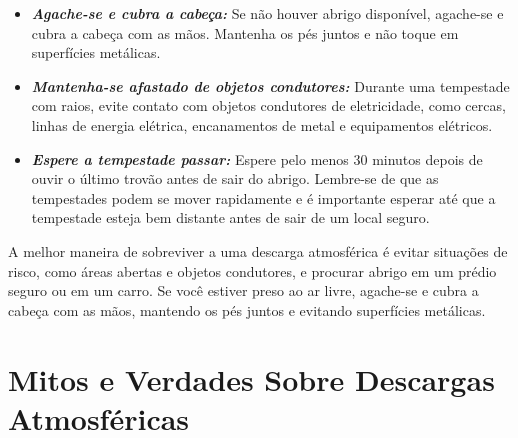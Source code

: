 \documentclass[a4paper, 12pt, onecolumn,singlespacing]{article}
\begin{document}
\begin{itemize}
\begin{itemize}
			\item \textbf{\textit{Agache-se e cubra a cabeça:}} Se não houver abrigo disponível, agache-se e cubra a cabeça com as mãos. Mantenha os pés juntos e não toque em superfícies metálicas.
			
			\item \textbf{\textit{Mantenha-se afastado de objetos condutores:}} Durante uma tempestade com raios, evite contato com objetos condutores de eletricidade, como cercas, linhas de energia elétrica, encanamentos de metal e equipamentos elétricos.
			
			\item \textbf{\textit{Espere a tempestade passar:}} Espere pelo menos 30 minutos depois de ouvir o último trovão antes de sair do abrigo. Lembre-se de que as tempestades podem se mover rapidamente e é importante esperar até que a tempestade esteja bem distante antes de sair de um local seguro.
		\end{itemize}		
		
		A melhor maneira de sobreviver a uma descarga atmosférica é evitar situações de risco, como áreas abertas e objetos condutores, e procurar abrigo em um prédio seguro ou em um carro. Se você estiver preso ao ar livre, agache-se e cubra a cabeça com as mãos, mantendo os pés juntos e evitando superfícies metálicas.
		
	\end{itemize}

	

	\section{Mitos e Verdades Sobre Descargas Atmosféricas}
	
\end{document}
